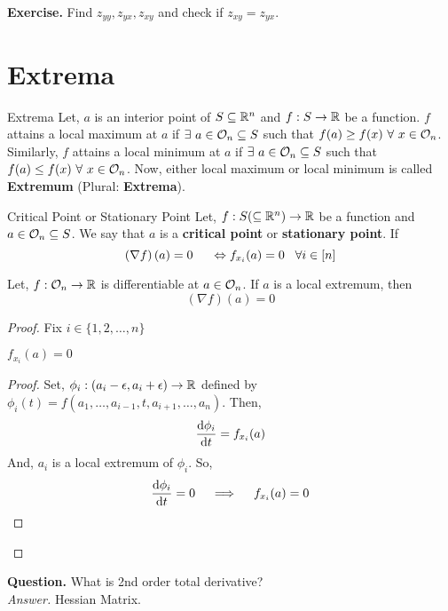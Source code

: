\documentclass[../Analysis-3]{subfiles}
\begin{document}
\textbf{Exercise.} Find $z_{yy}, z_{yx}, z_{xy}$ and check if $z_{xy} = z_{yx}$.

\section{Extrema}

\begin{Def}{Extrema}{}
    Let, $a$ is an interior point of $S \subseteq \mathbb{R}^n$ and $f : S \to \mathbb{R}$ be a function. $f$ attains a local maximum at $a$ if $\exists\ a \in \mathcal{O}_{n} \subseteq S$ such that $f(a) \geq f(x)\ \forall\ x \in \mathcal{O}_{n}$. Similarly, $f$ attains a local minimum at $a$ if $\exists\ a \in \mathcal{O}_{n} \subseteq S$ such that $f(a) \leq f(x)\ \forall\ x \in \mathcal{O}_{n}$. Now, either local maximum or local minimum is called \textbf{Extremum} (Plural: \textbf{Extrema}).
\end{Def}

\begin{Def}{Critical Point or Stationary Point}{}
    Let, $f : S (\subseteq \mathbb{R}^n) \to \mathbb{R}$ be a function and $a \in \mathcal{O}_{n} \subseteq S$. We say that $a$ is a \textbf{critical point} or \textbf{stationary point}.
    If \[ \left(\nabla f\right)(a) = 0 \hspace{5mm} \Leftrightarrow f_{x_i}(a) = 0 \hspace{3mm} \forall i \in [n] \]
\end{Def}

\begin{Thm}{}{}
    Let, $f: \mathcal{O}_{n} \to \mathbb{R}$ is differentiable at $a \in \mathcal{O}_{n}$. If $a$ is a local extremum, then \[ \left(\nabla f\right)(a) = 0 \]
\end{Thm}

\begin{proof}
    Fix $i \in \{1,2, \ldots, n\}$

    \begin{clmBox}
        $f_{x_i}(a) = 0$
    \end{clmBox}

    \begin{proof}
        Set, $\phi_i : (a_i - \epsilon, a_i + \epsilon) \to \mathbb{R}$ defined by $\phi_i(t) = f(a_1, \ldots, a_{i-1}, t, a_{i+1}, \ldots, a_n)$. Then, \[ \dv{\phi_i}{t}(a_i) = f_{x_i}(a) \]
        And, $a_i$ is a local extremum of $\phi_i$. So, \[ \dv{\phi_i}{t}(a_i) = 0 \quad \implies \quad f_{x_i}(a) = 0 \]
    \end{proof}
\end{proof}


\textbf{Question.} What is 2nd order total derivative? \\
\textit{Answer.} Hessian Matrix.
\end{document}
